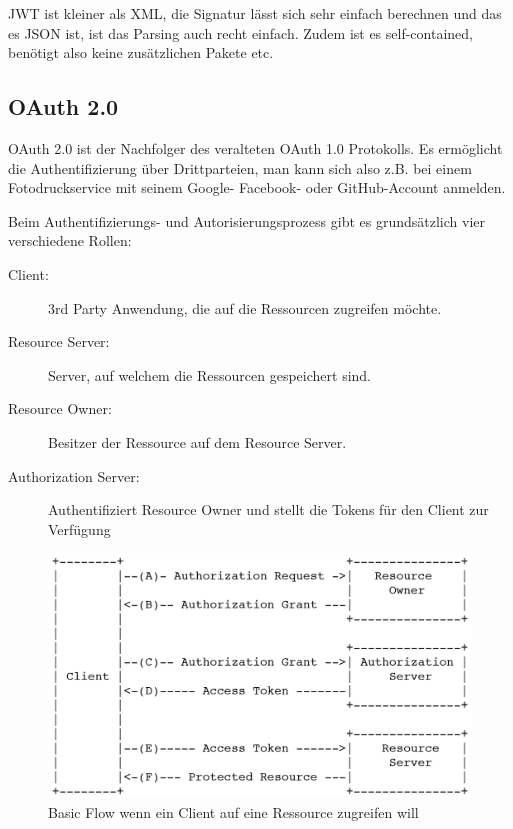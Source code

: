 \documentclass[a4paper, 11pt]{article}
\begin{document}
\vspace{10px}

\noindent JWT ist kleiner als XML, die Signatur lässt sich sehr einfach berechnen und das es JSON ist, ist das Parsing auch recht einfach. Zudem ist es self-contained, benötigt also keine zusätzlichen Pakete etc.

\subsection{OAuth 2.0}
OAuth 2.0 ist der Nachfolger des veralteten OAuth 1.0 Protokolls. Es ermöglicht die Authentifizierung über Drittparteien, man kann sich also z.B. bei einem Fotodruckservice mit seinem Google- Facebook- oder GitHub-Account anmelden.
\vspace{10px}

\noindent Beim Authentifizierungs- und Autorisierungsprozess gibt es grundsätzlich vier verschiedene Rollen:

\begin{description}
	\item[Client: ] 3rd Party Anwendung, die auf die Ressourcen zugreifen möchte.
	\item[Resource Server: ] Server, auf welchem die Ressourcen gespeichert sind.
	\item[Resource Owner: ] Besitzer der Ressource auf dem Resource Server.
	\item[Authorization Server: ] Authentifiziert Resource Owner und stellt die Tokens für den Client zur Verfügung
\end{description}

\begin{figure}[htb]
	\centering
	\includegraphics[keepaspectratio=true,height=15\baselineskip]{OAuth_BasicFlow.PNG}
	\caption{Basic Flow wenn ein Client auf eine Ressource zugreifen will}
	\label{fig:oauth-basic}
\end{figure}
\end{document}
